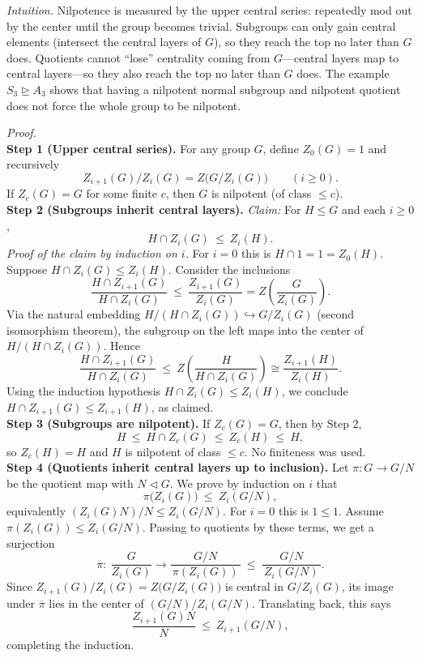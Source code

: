 \documentclass[12pt]{article}
\theoremstyle{definition}
\begin{document}
\newpage

\dotfill

\emph{Intuition.}
Nilpotence is measured by the upper central series: repeatedly mod out by the center until the group becomes trivial. Subgroups can only gain central elements (intersect the central layers of $G$), so they reach the top no later than $G$ does. Quotients cannot “lose” centrality coming from $G$—central layers map to central layers—so they also reach the top no later than $G$ does. The example $S_3\trianglerighteq A_3$ shows that having a nilpotent normal subgroup and nilpotent quotient does not force the whole group to be nilpotent.\\

\dotfill

\emph{Proof.}\\
\textbf{Step 1 (Upper central series).} For any group $G$, define $Z_0(G)=1$ and recursively
\[
Z_{i+1}(G)/Z_i(G)=Z\big(G/Z_i(G)\big)\qquad(i\ge0).
\]
If $Z_c(G)=G$ for some finite $c$, then $G$ is nilpotent (of class $\le c$).\\

\textbf{Step 2 (Subgroups inherit central layers).} \emph{Claim:} For $H\le G$ and each $i\ge0$,
\[
H\cap Z_i(G)\ \le\ Z_i(H).
\]
\emph{Proof of the claim by induction on $i$.} For $i=0$ this is $H\cap 1=1=Z_0(H)$. Suppose $H\cap Z_i(G)\le Z_i(H)$. Consider the inclusions
\[
\frac{H\cap Z_{i+1}(G)}{H\cap Z_i(G)}\ \le\ \frac{Z_{i+1}(G)}{Z_i(G)}=Z\!\left(\frac{G}{Z_i(G)}\right).
\]
Via the natural embedding $H/(H\cap Z_i(G))\hookrightarrow G/Z_i(G)$ (second isomorphism theorem), the subgroup on the left maps into the center of $H/(H\cap Z_i(G))$. Hence
\[
\frac{H\cap Z_{i+1}(G)}{H\cap Z_i(G)}\ \le\ Z\!\left(\frac{H}{H\cap Z_i(G)}\right)
 \cong \frac{Z_{i+1}(H)}{Z_i(H)}.
\]
Using the induction hypothesis $H\cap Z_i(G)\le Z_i(H)$, we conclude $H\cap Z_{i+1}(G)\le Z_{i+1}(H)$, as claimed.\\

\textbf{Step 3 (Subgroups are nilpotent).} If $Z_c(G)=G$, then by Step 2,
\[
H\ \le\ H\cap Z_c(G)\ \le\ Z_c(H)\ \le\ H,
\]
so $Z_c(H)=H$ and $H$ is nilpotent of class $\le c$. No finiteness was used.\\

\textbf{Step 4 (Quotients inherit central layers up to inclusion).} Let $\pi:G\to G/N$ be the quotient map with $N\lhd G$. We prove by induction on $i$ that
\[
\pi\big(Z_i(G)\big)\ \le\ Z_i(G/N),
\]
equivalently $(Z_i(G)N)/N\le Z_i(G/N)$. For $i=0$ this is $1\le 1$. Assume $\pi(Z_i(G))\le Z_i(G/N)$. Passing to quotients by these terms, we get a surjection
\[
\overline{\pi}:\ \frac{G}{Z_i(G)}\longrightarrow \frac{G/N}{\,\pi(Z_i(G))\,}\ \le\ \frac{G/N}{\,Z_i(G/N)\,}.
\]
Since $Z_{i+1}(G)/Z_i(G)=Z\big(G/Z_i(G)\big)$ is central in $G/Z_i(G)$, its image under $\overline{\pi}$ lies in the center of $(G/N)/Z_i(G/N)$. Translating back, this says
\[
\frac{Z_{i+1}(G)N}{N}\ \le\ Z_{i+1}(G/N),
\]
completing the induction.\\
\end{document}
